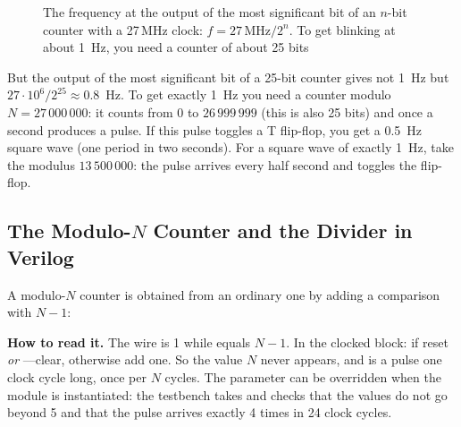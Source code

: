 \begin{figure}[H]
\centering
{}
\caption{The frequency at the output of the most significant bit of an $n$-bit counter with
a 27\,MHz clock: $f = 27\,\text{MHz}/2^n$. To get blinking at about 1~Hz, you need a
counter of about 25 bits}
\label{fig:div_plot}
\end{figure}

But the output of the most significant bit of a 25-bit counter gives not 1~Hz but
$27\cdot10^6/2^{25}\approx0.8$~Hz. To get exactly 1~Hz you need a counter
modulo $N=27\,000\,000$: it counts from 0 to $26\,999\,999$ (this is also 25
bits) and once a second produces a pulse. If this pulse toggles a
T flip-flop, you get a 0.5~Hz square wave (one period in two seconds). For a
square wave of exactly 1~Hz, take the modulus $13\,500\,000$: the pulse arrives every
half second and toggles the flip-flop.

\subsection{The Modulo-$N$ Counter and the Divider in Verilog}
\label{sec:regs-div-v}

A modulo-$N$ counter is obtained from an ordinary one by adding a comparison with
$N-1$:


\textbf{How to read it.} The wire  is 1 while  equals $N-1$. In
the clocked block: if reset \emph{or} ---clear, otherwise add one. So
the value $N$ never appears, and  is a pulse one clock cycle long, once
per $N$ cycles. The parameter  can be overridden when the module is
instantiated: the testbench takes  and checks that the values do not
go beyond 5 and that the pulse arrives exactly 4 times in 24 clock cycles.

